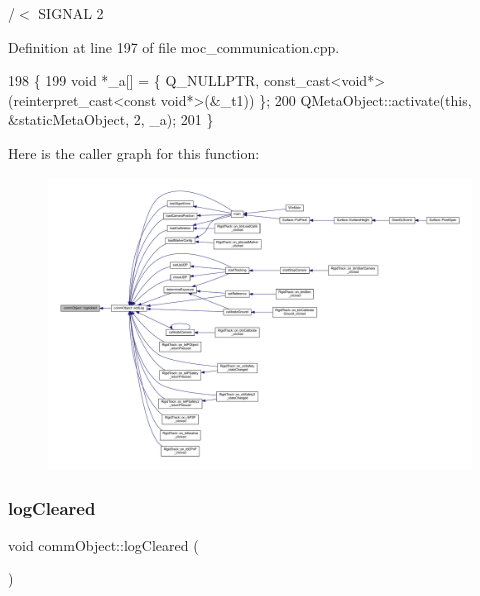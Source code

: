 /$<$ S\+I\+G\+N\+AL 2 



Definition at line 197 of file moc\+\_\+communication.\+cpp.


\begin{DoxyCode}
198 \{
199     \textcolor{keywordtype}{void} *\_a[] = \{ Q\_NULLPTR, \textcolor{keyword}{const\_cast<}\textcolor{keywordtype}{void}*\textcolor{keyword}{>}(\textcolor{keyword}{reinterpret\_cast<}\textcolor{keyword}{const }\textcolor{keywordtype}{void}*\textcolor{keyword}{>}(&\_t1)) \};
200     QMetaObject::activate(\textcolor{keyword}{this}, &staticMetaObject, 2, \_a);
201 \}
\end{DoxyCode}
Here is the caller graph for this function\+:\nopagebreak
\begin{figure}[H]
\begin{center}
\leavevmode
\includegraphics[width=350pt]{classcomm_object_a72620fe1bac16309baf6d148644edaf9_icgraph}
\end{center}
\end{figure}
\mbox{\label{classcomm_object_af2304085624c26230e9d930d616e3e19}} 
\subsubsection{\texorpdfstring{log\+Cleared}{logCleared}}
{\footnotesize\ttfamily void comm\+Object\+::log\+Cleared (\begin{DoxyParamCaption}{ }\end{DoxyParamCaption})\hspace{0.3cm}{\ttfamily [signal]}}



